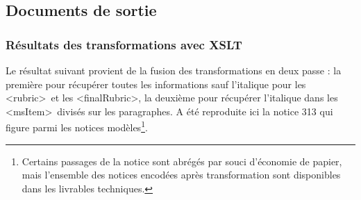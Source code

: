 \documentclass[a4paper,12pt,twoside]{book}
\begin{document}
	\subsection{Documents de sortie}
	
	\subsubsection{\label{resultats_XSLT}Résultats des transformations avec XSLT}
	
	Le résultat suivant provient de la fusion des transformations en deux passe : la première pour récupérer toutes les informations sauf l'italique pour les \textless rubric\textgreater~et les \textless finalRubric\textgreater, la deuxième pour récupérer l'italique dans les \textless msItem\textgreater~divisés sur les paragraphes. A été reproduite ici la notice 313 qui figure parmi les notices modèles\footnote{Certains passages de la notice sont abrégés par souci d'économie de papier, mais l'ensemble des notices encodées après transformation sont disponibles dans les livrables techniques.}. 
	
\end{document}
